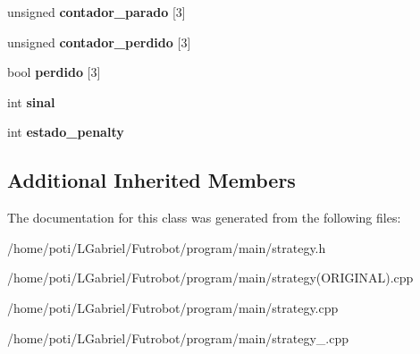 \begin{DoxyCompactItemize}
\item 
unsigned {\bfseries contador\+\_\+parado} \mbox{[}3\mbox{]}\hypertarget{classStrategy_ac60584c2cdfab9df6dc42623e488a54e}{}\label{classStrategy_ac60584c2cdfab9df6dc42623e488a54e}

\item 
unsigned {\bfseries contador\+\_\+perdido} \mbox{[}3\mbox{]}\hypertarget{classStrategy_ac7a0878fa29cafe479a4c0e746917145}{}\label{classStrategy_ac7a0878fa29cafe479a4c0e746917145}

\item 
bool {\bfseries perdido} \mbox{[}3\mbox{]}\hypertarget{classStrategy_a4c94dc915b3c0cf134ed6b645f268946}{}\label{classStrategy_a4c94dc915b3c0cf134ed6b645f268946}

\item 
int {\bfseries sinal}\hypertarget{classStrategy_aff151142cdec96b71cf5e76eb99f5838}{}\label{classStrategy_aff151142cdec96b71cf5e76eb99f5838}

\item 
int {\bfseries estado\+\_\+penalty}\hypertarget{classStrategy_a8c94772997d8d9f4c34a3673b51acb44}{}\label{classStrategy_a8c94772997d8d9f4c34a3673b51acb44}

\end{DoxyCompactItemize}
\subsection*{Additional Inherited Members}


The documentation for this class was generated from the following files\+:\begin{DoxyCompactItemize}
\item 
/home/poti/\+L\+Gabriel/\+Futrobot/program/main/strategy.\+h\item 
/home/poti/\+L\+Gabriel/\+Futrobot/program/main/strategy(\+O\+R\+I\+G\+I\+N\+A\+L).\+cpp\item 
/home/poti/\+L\+Gabriel/\+Futrobot/program/main/strategy.\+cpp\item 
/home/poti/\+L\+Gabriel/\+Futrobot/program/main/strategy\+\_.\+cpp\end{DoxyCompactItemize}
